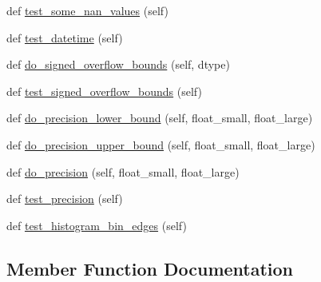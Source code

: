 \begin{DoxyCompactItemize}
\item 
def \hyperlink{classnumpy_1_1lib_1_1tests_1_1test__histograms_1_1TestHistogram_a6ccb6ec44e0e11f4a3c0b94d3464b851}{test\+\_\+some\+\_\+nan\+\_\+values} (self)
\item 
def \hyperlink{classnumpy_1_1lib_1_1tests_1_1test__histograms_1_1TestHistogram_a8db85648257253cc2fd6b71330b3e70a}{test\+\_\+datetime} (self)
\item 
def \hyperlink{classnumpy_1_1lib_1_1tests_1_1test__histograms_1_1TestHistogram_a51f9d3a288f21621488a727269c2644c}{do\+\_\+signed\+\_\+overflow\+\_\+bounds} (self, dtype)
\item 
def \hyperlink{classnumpy_1_1lib_1_1tests_1_1test__histograms_1_1TestHistogram_ae814c1ffa687977fadbb4be695b506df}{test\+\_\+signed\+\_\+overflow\+\_\+bounds} (self)
\item 
def \hyperlink{classnumpy_1_1lib_1_1tests_1_1test__histograms_1_1TestHistogram_aa012699afed750fe9d6567c9f5fff032}{do\+\_\+precision\+\_\+lower\+\_\+bound} (self, float\+\_\+small, float\+\_\+large)
\item 
def \hyperlink{classnumpy_1_1lib_1_1tests_1_1test__histograms_1_1TestHistogram_a2a39fa87c6b3879b6c7f01d1b0d8caab}{do\+\_\+precision\+\_\+upper\+\_\+bound} (self, float\+\_\+small, float\+\_\+large)
\item 
def \hyperlink{classnumpy_1_1lib_1_1tests_1_1test__histograms_1_1TestHistogram_a5b3c9d73f75c510f51ee28f2edbc7310}{do\+\_\+precision} (self, float\+\_\+small, float\+\_\+large)
\item 
def \hyperlink{classnumpy_1_1lib_1_1tests_1_1test__histograms_1_1TestHistogram_a98f30ef35eae3dfb1068df35dadb3263}{test\+\_\+precision} (self)
\item 
def \hyperlink{classnumpy_1_1lib_1_1tests_1_1test__histograms_1_1TestHistogram_a2ac7eedecb4a35a6b4c2b423dc37742c}{test\+\_\+histogram\+\_\+bin\+\_\+edges} (self)
\end{DoxyCompactItemize}


\subsection{Member Function Documentation}
\mbox{\label{classnumpy_1_1lib_1_1tests_1_1test__histograms_1_1TestHistogram_a5b3c9d73f75c510f51ee28f2edbc7310}} 
